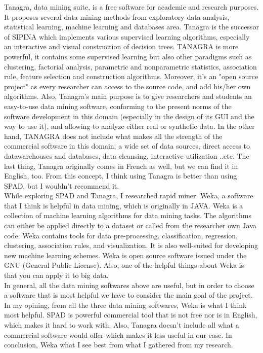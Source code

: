 \documentclass[12pt]{article}
\begin{document}
Tanagra, data mining suite, is a free software for academic and research purposes. It proposes several data mining methods from exploratory data analysis, statistical learning, machine learning and databases area. Tanagra is the successor of SIPINA which implements various supervised learning algorithms, especially an interactive and visual construction of decision trees. TANAGRA is more powerful, it contains some supervised learning but also other paradigms such as clustering, factorial analysis, parametric and nonparametric statistics, association rule, feature selection and construction algorithms. Moreover, it’s an "open source project" as every researcher can access to the source code, and add his/her own algorithms. Also, Tanagra’s main purpose is to give researchers and students an easy-to-use data mining software, conforming to the present norms of the software development in this domain (especially in the design of its GUI and the way to use it), and allowing to analyze either real or synthetic data. In the other hand, TANAGRA does not include what makes all the strength of the commercial software in this domain; a wide set of data sources, direct access to datawarehouses and databases, data cleansing, interactive utilization ..etc. The last thing, Tanagra originally comes in French as well, but we can find it in English, too. From this concept, I think using Tanagra is better than using SPAD, but I wouldn’t recommend it. \\
\hfil \break
While exploring SPAD and Tanagra, I researched rapid miner. Weka, a software that I think is helpful in data mining, which is originally in JAVA. Weka is a collection of machine learning algorithms for data mining tasks. The algorithms can either be applied directly to a dataset or called from the researcher own Java code. Weka contains tools for data pre-processing, classification, regression, clustering, association rules, and visualization. It is also well-suited for developing new machine learning schemes. Weka is open source software issued under the GNU (General Public License). Also, one of the helpful things about Weka is that you can apply it to big data. \\
\hfill \break
In general, all the data mining softwares above are useful, but in order to choose a software that is most helpful we have to consider the main goal of the project. In my opining, from all the three data mining softwares, Weka is what I think most helpful. SPAD is powerful commercial tool that is not free nor is in English, which makes it hard to work with. Also, Tanagra doesn’t include all what a commercial software would offer which makes it less useful in our case. In conclusion, Weka what I see best from what I gathered from my research. 
\end{document}
